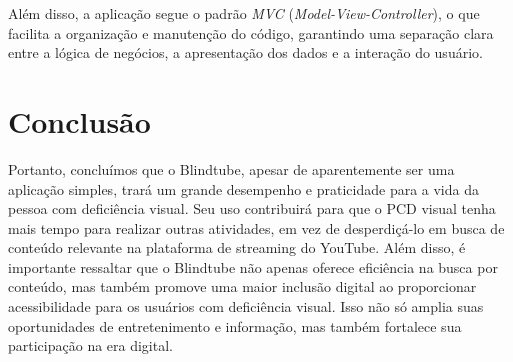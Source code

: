 \documentclass[12pt]{article}
\begin{document}
Além disso, a aplicação segue o padrão \textit{MVC} (\textit{Model-View-Controller}), o que facilita a organização e manutenção do código, garantindo uma separação clara entre a lógica de negócios, a apresentação dos dados e a interação do usuário.

\section{Conclusão}

Portanto, concluímos que o Blindtube, apesar de aparentemente ser uma aplicação simples, trará um grande desempenho e praticidade para a vida da pessoa com deficiência visual. Seu uso contribuirá para que o PCD visual tenha mais tempo para realizar outras atividades, em vez de desperdiçá-lo em busca de conteúdo relevante na plataforma de streaming do YouTube.
Além disso, é importante ressaltar que o Blindtube não apenas oferece eficiência na busca por conteúdo, mas também promove uma maior inclusão digital ao proporcionar acessibilidade para os usuários com deficiência visual. Isso não só amplia suas oportunidades de entretenimento e informação, mas também fortalece sua participação na era digital.


 
\end{document}
